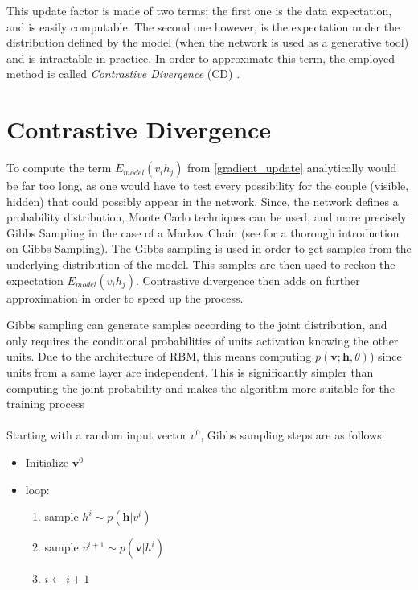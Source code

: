 \documentclass{report}
\begin{document}
	This update factor is made of two terms: the first one is the data expectation, 
	and is easily computable. The second one however, is the expectation under the 
	distribution defined by the model (when the network is used as a generative 
	tool) and is intractable in practice. In order to approximate this term, the 
	employed method is called \textit{Contrastive Divergence} 
	(CD) \cite{hinton2006fast}.
	
	\section{Contrastive Divergence}
	
	To compute the term $E_{model}(v_i h_j)$ from \ref{gradient_update} 
	analytically would be far too long, as one would have to test every possibility 
	for the couple (visible, hidden) that could possibly appear in the network. 
	Since, the network defines a probability distribution, Monte Carlo techniques 
	can be used, and more precisely Gibbs Sampling in the case of a Markov Chain 
	(see \cite{resnik2010gibbs} for a thorough introduction on Gibbs Sampling). The 
	Gibbs sampling is used in order to get samples from the underlying distribution 
	of the model. This samples are then used to reckon the expectation 
	$E_{model}(v_i h_j)$. Contrastive divergence then adds on further approximation 
	in order to speed up the process.
	
	Gibbs sampling can generate samples according to the joint distribution, and 
	only requires the conditional probabilities of units activation knowing the 
	other units. Due to the architecture of RBM, this 
	means computing $p(\textbf{v}; \textbf{h}, \theta)$) since units from a same layer are independent. This is significantly 
	simpler than computing the joint probability and makes the algorithm more 
	suitable for the training process
	\\\\
	Starting with a random input vector $v^0$, Gibbs sampling steps are as follows:
	
	\begin{itemize}
		\item Initialize $ \textbf{v}^0 $
		\item loop:
		\begin{enumerate}
			\item sample $h^i \sim p(\textbf{h} | v^i)$
			\item sample $v^{i+1} \sim p(\textbf{v} | h^i)$
			\item $i \leftarrow i+1$
		\end{enumerate}
	\end{itemize}
\end{document}
